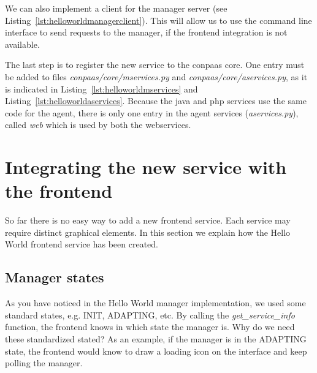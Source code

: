 \documentclass[10pt]{article}
\newcommand{\ConPaaSHOME}{..}
\begin{document}


We can also implement a client for the manager server (see Listing~\ref{lst:helloworldmanagerclient}). This will allow us to use the command line interface to send requests to the manager, if the frontend integration is not available.



The last step is to register the new service to the conpaas core. One entry must be added to files \textit{conpaas/core/mservices.py} and \textit{conpaas/core/aservices.py}, as it is indicated in Listing~\ref{lst:helloworldmservices} and Listing~\ref{lst:helloworldaservices}. Because the java and php services use the same code for the agent, there is only one entry in the agent services (\textit{aservices.py}), called \textit{web} which is used by both the webservices.





\section{Integrating the new service with the frontend}

So far there is no easy way to add a new frontend service. Each service may require distinct graphical elements. In this section we explain how the Hello World frontend service has been created.

\subsection{Manager states}
As you have noticed in the Hello World manager implementation, we used some standard states, e.g. INIT, ADAPTING, etc. By calling the \textit{get\_service\_info} function, the frontend knows in which state the manager is. Why do we need these standardized stated? As an example, if the manager is in the ADAPTING state, the frontend would know to draw a loading icon on the interface and keep polling the manager. 
\end{document}
